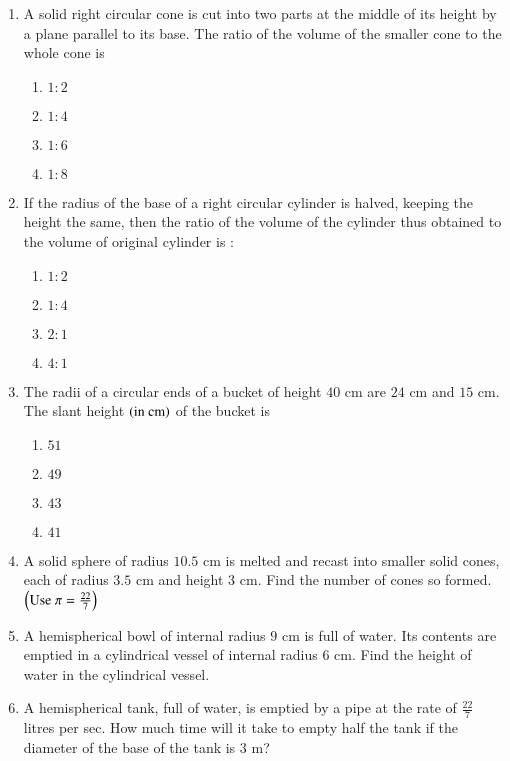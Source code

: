 \begin{enumerate}
\item A solid right circular cone is cut into two parts at the middle of its height by a plane parallel to its base. The ratio of the volume of the smaller cone to the whole cone is 
\begin{enumerate}
\item $1 : 2$ 
\item $1 : 4$ 
\item $1 : 6$ 
\item $1 : 8$ 
\end{enumerate}
\item If the radius of the base of a right circular cylinder is halved, keeping the height the same, then the ratio of the volume of the cylinder thus obtained to the volume of original cylinder is : 
\begin{enumerate}
\item $1 : 2$ 
\item $1 : 4$ 
\item $2 : 1$ 
\item $4 : 1$ 
\end{enumerate}
\item The radii of a circular ends of a bucket of height $40\text{ cm}$ are $24\text{ cm}$ and $15\text{ cm}$. The slant height $\left(\text{in cm}\right)$ of the bucket is 
\begin{enumerate}
\item $51$ 
\item $49$ 
\item $43$ 
\item $41$ 
\end{enumerate}

\item A solid sphere of radius $10.5 \text{ cm}$ is melted and recast into smaller solid cones, each of radius $3.5 \text{ cm}$ and height $3 \text{ cm}$. Find the number of cones so formed. $\left(\text{Use } \pi = \frac{22}{7}\right)$ 

\item A hemispherical bowl of internal radius $9 \text{ cm}$ is full of water. Its contents are emptied in a cylindrical vessel of internal radius $6 \text{ cm}$. Find the height of water in the cylindrical vessel. 


\item A hemispherical tank, full of water, is emptied by a pipe at the rate of $\frac{22}{7}$ litres per sec. How much time will it take to empty half the tank if the diameter of the base of the tank is $3 \text{ m}$? 


\end{enumerate}
